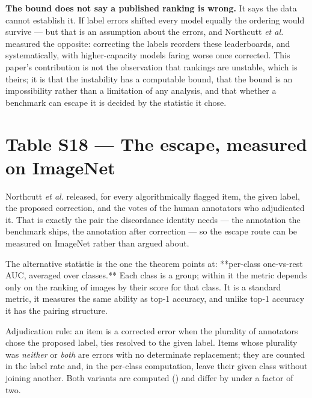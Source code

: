 \textbf{The bound does not say a published ranking is wrong.} It says the data cannot
establish it. If label errors shifted every model equally the ordering would
survive --- but that is an assumption about the errors, and Northcutt \emph{et al.}
measured the opposite: correcting the labels reorders these leaderboards, and
systematically, with higher-capacity models faring worse once corrected. This
paper's contribution is not the observation that rankings are unstable, which is
theirs; it is that the instability has a computable bound, that the bound is an
impossibility rather than a limitation of any analysis, and that whether a
benchmark can escape it is decided by the statistic it chose.


\section*{Table S18 --- The escape, measured on ImageNet}

Northcutt \emph{et al.} released, for every algorithmically flagged item, the given
label, the proposed correction, and the votes of the human annotators who
adjudicated it. That is exactly the  pair the discordance identity needs
---  the annotation the benchmark ships,  the annotation after correction ---
so the escape route can be measured on ImageNet rather than argued about.

The alternative statistic is the one the theorem points at: **per-class
one-vs-rest AUC, averaged over classes.** Each class is a group; within it the
metric depends only on the ranking of images by their score for that class. It
is a standard metric, it measures the same ability as top-1 accuracy, and unlike
top-1 accuracy it has the pairing structure.

Adjudication rule: an item is a corrected error when the plurality of annotators
chose the proposed label, ties resolved to the given label. Items whose
plurality was \emph{neither} or \emph{both} are errors with no determinate replacement;
they are counted in the label rate and, in the per-class computation, leave
their given class without joining another. Both variants are computed
() and differ by under a factor of two.

